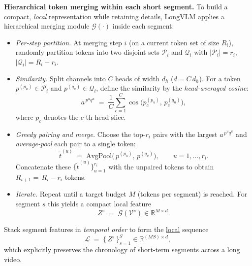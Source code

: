 \begin{enrichment}
\begin{enrichment}
        \medskip
        \textbf{Hierarchical token merging within each short segment.}
        To build a compact, \emph{local} representation while retaining details, LongVLM applies a hierarchical merging module $\mathcal{G}(\cdot)$ inside each segment:
        \begin{itemize}
            \item \emph{Per-step partition.} At merging step $i$ (on a current token set of size $R_i$), randomly partition tokens into two disjoint sets $\mathcal{P}_i$ and $\mathcal{Q}_i$ with $|\mathcal{P}_i|{=}r_i$, $|\mathcal{Q}_i|{=}R_i{-}r_i$.
            \item \emph{Similarity.} Split channels into $C$ heads of width $d_h$ ($d{=}C\,d_h$). For a token $p^{(p_u)}\!\in\!\mathcal{P}_i$ and $p^{(q_u)}\!\in\!\mathcal{Q}_i$, define the similarity by the \emph{head-averaged cosine}:
            \begin{equation}
                a^{\,p^{u}q^{u}}
                \;=\;
                \frac{1}{C}\sum_{c=1}^{C}
                \cos\!\Big(p^{(p_u)}_{c},\,p^{(q_u)}_{c}\Big),
                \label{eq:longvlm_cos}
            \end{equation}
            where $p_c$ denotes the $c$-th head slice.
            \item \emph{Greedy pairing and merge.} Choose the top-$r_i$ pairs with the largest $a^{\,p^{u}q^{u}}$ and \emph{average-pool} each pair to a single token:
            \begin{equation}
                \tilde{t}^{(u)}
                \;=\;
                \mathrm{AvgPool}\!\Big(\,p^{(p_u)},\,p^{(q_u)}\!\Big),
                \qquad u=1,\dots,r_i.
                \label{eq:longvlm_merge}
            \end{equation}
            Concatenate these $\{\tilde{t}^{(u)}\}_{u=1}^{r_i}$ with the unpaired tokens to obtain $R_{i+1}{=}\,R_i{-}r_i$ tokens.
            \item \emph{Iterate.} Repeat until a target budget $M$ (tokens per segment) is reached. For segment $s$ this yields a compact local feature
            \begin{equation}
                Z^{s}
                \;=\;
                \mathcal{G}(\mathcal{V}^{s})
                \in\mathbb{R}^{M\times d}.
                \label{eq:longvlm_seg_z}
            \end{equation}
        \end{itemize}
        Stack segment features in \emph{temporal order} to form the \underline{local} sequence
        \begin{equation}
            \mathcal{L}
            \;=\;
            \big\{\,Z^{s}\,\big\}_{s=1}^{S}
            \in\mathbb{R}^{(MS)\times d},
            \label{eq:longvlm_local_seq}
        \end{equation}
        which explicitly preserves the chronology of short-term segments across a long video.
        

\end{enrichment}
\end{enrichment}
